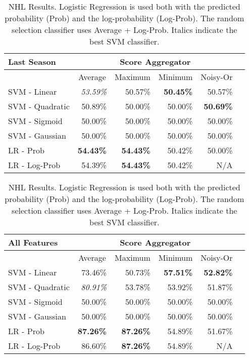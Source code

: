 \documentclass[conference]{IEEEtran}
\begin{document}
\begin{table}[htbp]
\centering
\caption{NHL Results. Logistic Regression is  used both with the predicted probability (Prob) and the log-probability (Log-Prob). The random selection classifier uses Average + Log-Prob. Italics indicate the best SVM classifier.}
\centering
\begin{tabular}{|l|r|r|r|r|r|}
\hline
 Last Season & \multicolumn{4}{c|}{Score Aggregator} \\ \hline
 & \multicolumn{ 1}{c|}{Average} & \multicolumn{ 1}{c|}{Maximum} & \multicolumn{ 1}{c|}{Minimum} &
\multicolumn{ 1}{c|}{Noisy-Or} \\\hline \cline{ 1- 1}
SVM - Linear & \textit{53.59\%} & 50.57\% & \textbf{50.45\%} & 50.57\% \\ \hline
SVM - Quadratic & 50.89\% & 50.00\% & 50.00\% & \textbf{50.69\%} \\ \hline
SVM - Sigmoid & 50.00\% & 50.00\% & 50.00\%  & 50.00\% \\ \hline
SVM - Gaussian & 50.00\% & 50.00\% & 50.00\% & 50.00\% \\ \hline
LR - Prob & \textbf{54.43\%} & \textbf{54.43\%} & 50.42\% & 50.00\% \\ \hline
LR - Log-Prob & 54.39\% & \textbf{54.43\%} & 50.42\% & N/A \\ \hline
\end{tabular}

\centering
\begin{tabular}{|l|r|r|r|r|r|}
\hline
 All Features & \multicolumn{4}{c|}{Score Aggregator}\\ \hline
 & \multicolumn{ 1}{c|}{Average} & \multicolumn{ 1}{c|}{Maximum} & \multicolumn{ 1}{c|}{Minimum} &
\multicolumn{ 1}{c|}{Noisy-Or}  \\\hline \cline{ 1- 1}
SVM - Linear & 73.46\% & 50.73\% & \textbf{57.51\%} & \textbf{52.82\%} \\ \hline
SVM - Quadratic & \textit{80.91\%} & 53.78\% & 53.92\% & 51.87\% \\ \hline
SVM - Sigmoid & 50.00\% & 50.00\% & 50.00\% & 50.00\% \\ \hline
SVM - Gaussian & 50.00\% & 50.00\% & 50.00\% & 50.00\% \\ \hline
LR - Prob & \textbf{87.26\%} & \textbf{87.26\%} & 54.89\% & 51.67\% \\ \hline
LR - Log-Prob & 86.60\% & \textbf{87.26\%} & 54.89\% & N/A \\ \hline
\end{tabular}
\label{table:nhl-score}
\end{table}%
\end{document}
